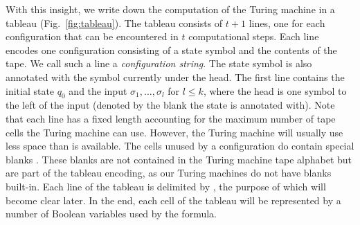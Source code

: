 With this insight, we write down the computation of the Turing machine in a tableau (Fig.~\ref{fig:tableau}).
The tableau consists of $t+1$ lines, one for each configuration that can be encountered in $t$ computational steps. Each line encodes one configuration consisting of a state symbol and the contents of the tape. We call such a line a \emph{configuration string}. The state symbol is also annotated with the symbol currently under the head.
The first line contains the initial state $q_0$ and the input $\sigma_1, \ldots, \sigma_l$ for $l \le k$, where the head is one symbol to the left of the input (denoted by the blank the state is annotated with).
Note that each line has a fixed length accounting for the maximum number of tape cells the Turing machine can use. However, the Turing machine will usually use less space than is available. The cells unused by a configuration do contain special blanks \blank.
These blanks are not contained in the Turing machine tape alphabet but are part of the tableau encoding, as our Turing machines do not have blanks built-in.
Each line of the tableau is delimited by \delim, the purpose of which will become clear later.
In the end, each cell of the tableau will be represented by a number of Boolean variables used by the \SAT{} formula.

